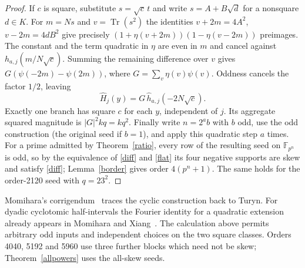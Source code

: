 \documentclass[11pt]{article}
\newcommand{\F}{\mathbb F}
\begin{document}
\begin{proof}
If $c$ is square, substitute $s=\sqrt c\,t$ and write $s=A+B\sqrt d$ for a nonsquare $d\in K$. For $m=Ns$ and $v=\operatorname{Tr}(s^2)$ the identities $v+2m=4A^2$, $v-2m=4dB^2$ give precisely $(1+\eta(v+2m))(1-\eta(v-2m))$ preimages. The constant and the term quadratic in $\eta$ are even in $m$ and cancel against $h_{a,j}(m/N\sqrt c)$. Summing the remaining difference over $v$ gives $G(\psi(-2m)-\psi(2m))$, where $G=\sum_v\eta(v)\psi(v)$. Oddness cancels the factor $1/2$, leaving
\[
 \widehat H_j(y)=G\,\widehat h_{a,j}(-2N\sqrt c).
\]
Exactly one branch has square $c$ for each $y$, independent of $j$. Its aggregate squared magnitude is $|G|^2 kq=kq^2$. Finally write $n=2^a b$ with $b$ odd, use the odd construction (the original seed if $b=1$), and apply this quadratic step $a$ times. For a prime admitted by Theorem~\ref{ratio}, every row of the resulting seed on $\F_{p^n}$ is odd, so by the equivalence of \eqref{diff} and \eqref{flat} its four negative supports are skew and satisfy \eqref{diff}; Lemma~\ref{border} gives order $4(p^n+1)$. The same holds for the order-2120 seed with $q=23^2$.
\end{proof}

Momihara's corrigendum~\cite{Mom} traces the cyclic construction back to Turyn. For dyadic cyclotomic half-intervals the Fourier identity for a quadratic extension already appears in Momihara and Xiang~\cite[Prop.~3.1]{MX}. The calculation above permits arbitrary odd inputs and independent choices on the two square classes. Orders 4040, 5192 and 5960 use three further blocks which need not be skew; Theorem~\ref{allpowers} uses the all-skew seeds.
\end{document}

